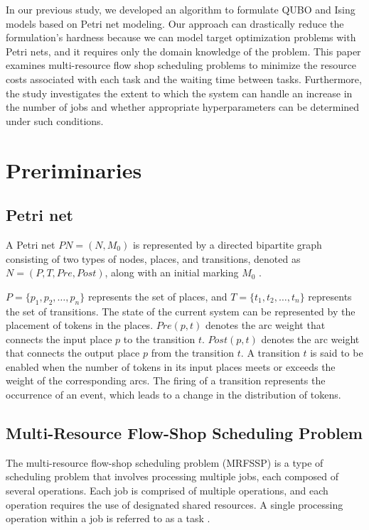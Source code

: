 \documentclass[conference]{IEEEtran}
\begin{document}
In our previous study, we developed an algorithm to formulate QUBO and Ising models based on Petri net modeling. Our approach can drastically reduce the formulation's hardness because we can model target optimization problems with Petri nets, and it requires only the domain knowledge of the problem.
This paper examines multi-resource flow shop scheduling problems to minimize the resource costs associated with each task and the waiting time between tasks. Furthermore, the study investigates the extent to which the system can handle an increase in the number of jobs and whether appropriate hyperparameters can be determined under such conditions.

\section{Preriminaries}

\subsection{Petri net}
A Petri net $PN = (N,M_0)$ is represented by a directed bipartite graph consisting of two types of nodes, places, and transitions, denoted as $N = (P,T,Pre,Post)$, along with an initial marking $M_0$ \cite{murata, cpn}.

$P = \{p_1, p_2, \ldots, p_n\}$ represents the set of places, and $T = \{t_1, t_2, \ldots, t_n\}$ represents the set of transitions. The state of the current system can be represented by the placement of tokens in the places. $Pre(p,t)$ denotes the arc weight that connects the input place $p$ to the transition $t$. $Post(p,t)$ denotes the arc weight that connects the output place $p$ from the transition $t$. A transition $t$ is said to be enabled when the number of tokens in its input places meets or exceeds the weight of the corresponding arcs. The firing of a transition represents the occurrence of an event, which leads to a change in the distribution of tokens.


\subsection{Multi-Resource Flow-Shop Scheduling Problem} 
The multi-resource flow-shop scheduling problem (MRFSSP) is a type of scheduling problem that involves processing multiple jobs, each composed of several operations. 
Each job is comprised of multiple operations, and each operation requires the use of designated shared resources. A single processing operation within a job is referred to as a task \cite{Nouri}.
\end{document}
